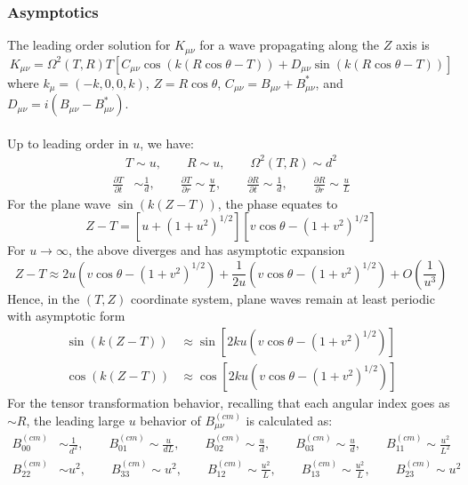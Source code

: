 \documentclass[10pt,letterpaper]{article}
\begin{document}
\subsubsection*{Asymptotics}
The leading order solution for $K_{\mu\nu}$ for a wave propagating along the $Z$ axis is
\begin{equation}
K_{\mu\nu} = \Omega^2(T,R)T\left[ C_{\mu\nu}  \cos(k(R\cos\theta - T)) + D_{\mu\nu} \sin(k(R\cos\theta - T)) \right]
\end{equation}
where $k_{\mu} = (-k,0,0,k)$, $Z = R\cos\theta$, $C_{\mu\nu} = B_{\mu\nu}+B^*_{\mu\nu} $, and $D_{\mu\nu} = i(B_{\mu\nu}-B^*_{\mu\nu})$.
\\ \\
Up to leading order in $u$, we have:
\begin{align}
T\sim u,\qquad R \sim u,\qquad \Omega^2(T,R) \sim d^2
\end{align}
\begin{align}
\frac{\partial T}{\partial t} & \sim \frac{1}{d},\qquad
\frac{\partial T}{\partial r}  \sim 	\frac{u}{L},\qquad
\frac{\partial R}{\partial t}  \sim \frac{1}{d},\qquad
\frac{\partial R}{\partial r}  \sim \frac{u}{L}
\end{align}
For the plane wave $\sin(k(Z-T))$, the phase equates to
\begin{equation}
Z-T = \left[u+(1+u^2)^{1/2}\right]\left[v\cos\theta - ( 1+v^2)^{1/2}\right]
\end{equation}
For $u \to \infty$, the above diverges and has asymptotic expansion
\begin{equation}
Z-T \approx 2 u \left( v\cos\theta - (1+v^2)^{1/2}\right) + \frac{1}{2u}\left( v\cos\theta - (1+v^2)^{1/2}\right) + O\left( \frac{1}{u^3}\right)
\end{equation}
Hence, in the $(T,Z)$ coordinate system, plane waves remain at least periodic with asymptotic form
\begin{align}
\sin(k(Z-T)) &\approx \sin\left[ 2 k u \left( v\cos\theta - (1+v^2)^{1/2}\right)\right]\nonumber\\
\cos(k(Z-T)) &\approx \cos\left[ 2 k u \left( v\cos\theta - (1+v^2)^{1/2}\right)\right]
\end{align}
For the tensor transformation behavior, recalling that each angular index goes as $\sim R$, the leading large $u$ behavior of $B_{\mu\nu}^{(cm)}$ is calculated as:
\begin{align}
B^{(cm)}_{00} &\sim \frac{1}{d^2},\qquad 
B^{(cm)}_{01} \sim \frac{u}{dL},\qquad 
B^{(cm)}_{02} \sim \frac{u}{d},\qquad 
B^{(cm)}_{03} \sim \frac{u}{d} ,\qquad 
B^{(cm)}_{11} \sim \frac{u^2}{L^2} \nonumber\\
B^{(cm)}_{22} &\sim u^2 ,\qquad 
B^{(cm)}_{33} \sim u^2 ,\qquad 
B^{(cm)}_{12} \sim \frac{u^2}{L} ,\qquad 
B^{(cm)}_{13} \sim \frac{u^2}{L} ,\qquad 
B^{(cm)}_{23} \sim u^2
\end{align}
\end{document}
